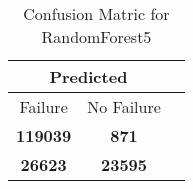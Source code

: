 \begin{table}[] 
\caption{Confusion Matric for RandomForest5} 
\label{Table: Prediction Accuracy-DMDRandomForest5OnlySunEKF-combinationReflectionEKF-top2perfectNoFailurePrediction-Reflection} 
\centering 
\begin{tabular} 
 {@{}ccc@{}} 
\toprule 
\multicolumn{2}{c}{\textbf{Predicted}}
 \\ \midrule 
\multicolumn{1}{|c|}{Failure} & 
\multicolumn{1}{c|}{No Failure}
 \\ \midrule 
\multicolumn{1}{|c|}{\color{green}\textbf{119039}} & 
\multicolumn{1}{c|}{\color{red}\textbf{871}}
 \\ \midrule 
\multicolumn{1}{|c|}{\color{red}\textbf{26623}} & 
\multicolumn{1}{c|}{\color{green}\textbf{23595}}
 \\ \bottomrule 
\end{tabular} 
\end{table} 
